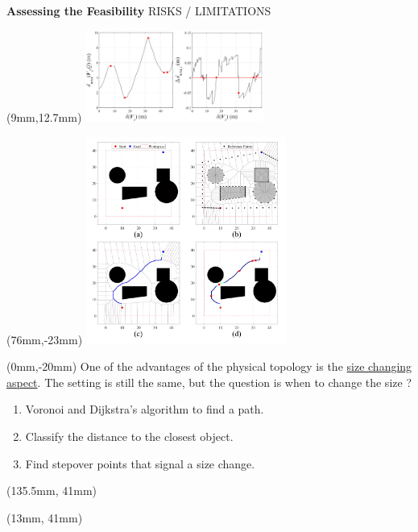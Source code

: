 \documentclass[11pt,aspectratio=169]{beamer}
\begin{document}
\begin{frame}[fragile]{\textbf{Assessing the Feasibility} \hfill \fontsize{8}{8}\selectfont RISKS / LIMITATIONS}
    
        \begin{textblock*}{5cm}(9mm,12.7mm) %
        \includegraphics[height=30mm]{elements/[21]-PRT-V.png}
        \end{textblock*}

        \begin{textblock*}{5cm}(76mm,-23mm) %
        \includegraphics[height=68mm]{elements/[20]-PRT-V.png}
        \end{textblock*}

        \begin{textblock*}{74mm}(0mm,-20mm)
        One of the advantages of the physical topology is the \uline{size changing aspect}. The setting is still the same, but the question is when to change the size ?
        \vspace{2mm}
        \begin{enumerate}
            \item Voronoi and Dijkstra's algorithm to find a path.
            \item Classify the distance to the closest object.
            \item Find \alert{stepover} points that signal a size change.
        \end{enumerate}
        \end{textblock*}


        \begin{textblock*}{5cm}(135.5mm, 41mm) %
        {\tiny \cite{9477154}}
        \end{textblock*}

        \begin{textblock*}{5cm}(13mm, 41mm) %
        {\tiny \cite{9477154}}
        \end{textblock*}

        \vspace{10mm}

\end{frame}
\end{document}

